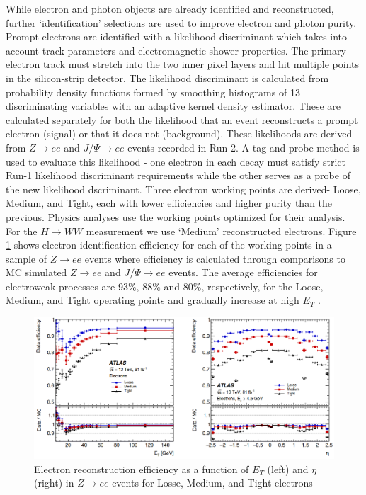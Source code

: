 While electron and photon objects are already identified and reconstructed, further `identification' selections are used to improve electron and photon purity. Prompt electrons are identified with a likelihood discriminant which takes into account track parameters and electromagnetic shower properties. The primary electron track must stretch into the two inner pixel layers and hit multiple points in the silicon-strip detector. The likelihood discriminant is calculated from probability density functions formed by smoothing histograms of 13 discriminating variables with an adaptive kernel density estimator.  These are calculated separately for both the likelihood that an event reconstructs a prompt electron (signal) or that it does not (background). These likelihoods are derived from $Z\rightarrow ee$ and $J/\Psi\rightarrow ee$ events recorded in Run-2. A tag-and-probe method is used to evaluate this likelihood - one electron in each decay must satisfy strict Run-1 likelihood discriminant requirements while the other serves as a probe of the new likelihood dscriminant. Three electron working points are derived- Loose, Medium, and Tight, each with lower efficiencies and higher purity than the previous. Physics analyses use the working points optimized for their analysis. For the $H\rightarrow WW$ measurement we use `Medium' reconstructed electrons. Figure \ref{fig:ElectronEff} shows electron identification efficiency for each of the working points in a sample of $Z\rightarrow ee$ events where efficiency is calculated through comparisons to MC simulated $Z\rightarrow ee$ and $J/\Psi\rightarrow ee$ events. The average efficiencies for electroweak processes are 93\%, 88\% and 80\%, respectively, for the Loose, Medium, and Tight operating points and gradually increase at high $E_T$ \cite{ElectronPhotonPerformance}.

\begin{figure}[!h]
        \centering
    \includegraphics[width=.75\textwidth]{Pictures/ElectroEff.png}
    \caption{ Electron reconstruction efficiency as a function of $E_T$ (left) and $\eta$ (right) in $Z\rightarrow ee$ events for Losse, Medium, and Tight electrons \cite{ElectronPhotonPerformance}}
    \label{fig:ElectronEff}
\end{figure}

